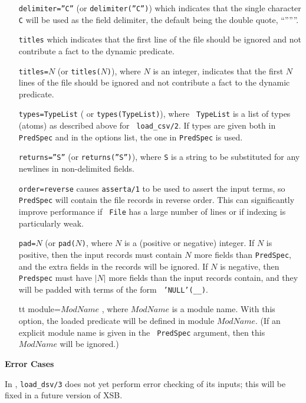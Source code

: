 \begin{description}
\begin{itemize}
  {\tt Example: } To load a tab-separated file (tsv) use 
    \verb|separator="\t"| in the options list.
\item[{\tt delimiter=''C''}] (or {\tt delimiter(''C'')}) which
  indicates that the single character {\tt C} will be used as the
  field delimiter, the default being the double quote, ``''''''.
\item[{\tt titles}] which indicates that the first line of the file should
  be ignored and not contribute a fact to the dynamic predicate.
\item[{\tt titles=$N$}] (or {\tt titles($N$)}), where $N$ is an integer,
  indicates that the first $N$ lines of the file should be ignored and
  not contribute a fact to the dynamic predicate.
\item[{\tt types=TypeList}] ( or {\tt types(TypeList)}), where {\tt
  TypeList} is a list of types (atoms) as described above for {\tt
  load\_csv/2}.  If types are given both in {\tt PredSpec} and in the
  options list, the one in {\tt PredSpec} is used.
\item[{\tt returns=''S''}] (or {\tt returns(''S'')}), where {\tt S} is
  a string to be substituted for any newlines in non-delimited fields.
\item[{\tt order=reverse}] causes {\tt asserta/1} to be used to assert the
  input terms, so {\tt PredSpec} will contain the file records in
  reverse order.  This can significantly improve performance if {\tt
    File} has a large number of lines or if indexing is particularly
  weak.
\item[{\tt pad=$N$}] (or {\tt pad($N$)}, where $N$ is a (positive or
  negative) integer.  If $N$ is positive, then the input records must
  contain $N$ more fields than {\tt PredSpec}, and the extra fields in
  the records will be ignored.  If $N$ is negative, then {\tt
    Predspec} must have $|N|$ more fields than the input records
  contain, and they will be padded with terms of the form {\tt
    'NULL'(\_\_)}.
\item[{tt module=$ModName$}], where $ModName$ is a module name.  With
  this option, the loaded predicate will be defined in module
  $ModName$.  (If an explicit module name is given in the {\tt
    PredSpec} argument, then this $ModName$ will be ignored.)
\end{itemize}

{\bf Error Cases} 

In \version{}, {\tt load\_dsv/3} does not yet perform error checking of its
inputs; this will be fixed in a future version of XSB.


\end{description}
